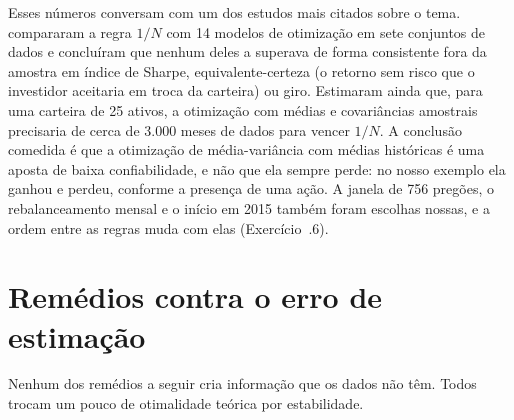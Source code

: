Esses números conversam com um dos estudos mais citados sobre o tema. \citet{demiguel2009} compararam a regra $1/N$ com 14 modelos de otimização em sete conjuntos de dados e concluíram que nenhum deles a superava de forma consistente fora da amostra em índice de Sharpe, equivalente-certeza (o retorno sem risco que o investidor aceitaria em troca da carteira) ou giro. Estimaram ainda que, para uma carteira de 25 ativos, a otimização com médias e covariâncias amostrais precisaria de cerca de 3.000 meses de dados para vencer $1/N$. A conclusão comedida é que a otimização de média-variância com médias históricas é uma aposta de baixa confiabilidade, e não que ela sempre perde: no nosso exemplo ela ganhou e perdeu, conforme a presença de uma ação. A janela de 756 pregões, o rebalanceamento mensal e o início em 2015 também foram escolhas nossas, e a ordem entre as regras muda com elas (Exercício~\thechapter.6).

\section{Remédios contra o erro de estimação}
\label{sec:c08-remedios}

Nenhum dos remédios a seguir cria informação que os dados não têm. Todos trocam um pouco de otimalidade teórica por estabilidade.

